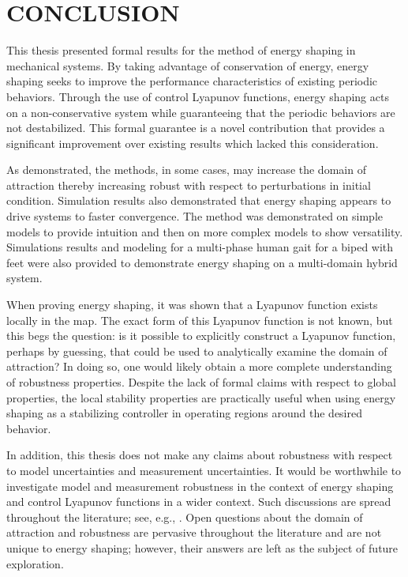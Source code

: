 \chapter{\uppercase{Conclusion}}

This thesis presented formal results for the method of energy shaping in
mechanical systems.
%
By taking advantage of conservation of energy, energy shaping seeks to improve
the performance characteristics of existing periodic behaviors.
%
Through the use of control Lyapunov functions, energy shaping acts on a
non-conservative system while guaranteeing that the periodic behaviors are not
destabilized.
%
This formal guarantee is a novel contribution that provides a significant
improvement over existing results which lacked this consideration.


As demonstrated, the methods, in some cases, may increase the domain of
attraction thereby increasing robust with respect to perturbations in initial
condition.
%
Simulation results also demonstrated that energy shaping appears to drive
systems to faster convergence.
%
The method was demonstrated on simple models to provide intuition and then on
more complex models to show versatility.
%
Simulations results and modeling for a multi-phase human gait for a biped with
feet were also provided to demonstrate energy shaping on a multi-domain hybrid
system.


When proving energy shaping, it was shown that a Lyapunov function exists
locally in the \Poincare{} map.
%
The exact form of this Lyapunov function is not known, but this begs the
question:
%
is it possible to explicitly construct a Lyapunov function, perhaps by guessing,
that could be used to analytically examine the domain of attraction?
%
In doing so, one would likely obtain a more complete understanding of robustness
properties.
%
Despite the lack of formal claims with respect to global properties, the local
stability properties are practically useful when using energy shaping as a
stabilizing controller in operating regions around the desired behavior.


In addition, this thesis does not make any claims about robustness with respect
to model uncertainties and measurement uncertainties.
%
It would be worthwhile to investigate model and measurement robustness in the
context of energy shaping and control Lyapunov functions in a wider context.
%
Such discussions are spread throughout the literature; see, e.g.,
\cite{Freeman1996}.
%
Open questions about the domain of attraction and robustness are pervasive
throughout the literature and are not unique to energy shaping;
%
however, their answers are left as the subject of future exploration.


